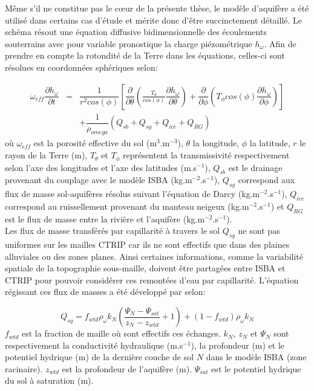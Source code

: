 Même s'il ne constitue pas le cœur de la présente thèse, le modèle d'aquifère a été utilisé dans certains cas d'étude et mérite donc d'être succinctement détaillé.
Le schéma résout une équation diffusive bidimensionnelle des écoulements souterrains avec pour variable pronostique la charge piézométrique $h_{\omega}$. Afin de prendre en compte la rotondité de la Terre dans les équations, celles-ci sont résolues en coordonnées sphériques selon:

\begin{eqnarray}
\omega_{eff} \dfrac{\partial h_{\omega}}{\partial t} &=& \dfrac{1}{r^{2} cos(\phi)}\left[\dfrac{\partial}{\partial \theta}\left(\frac{T_{\theta}}{cos(\phi)}\dfrac{\partial h_{\omega}}{\partial \theta}\right)+\dfrac{\partial}{\partial \phi}\left(T_{\phi}cos(\phi)\dfrac{\partial h_{\omega}}{\partial \phi}\right)\right] \\
& & + \dfrac{1}{\rho_{omega}}(Q_{sb}+Q_{sg}+Q_{ice}+Q_{RG}) \nonumber
\end{eqnarray}
où $\omega_{eff}$ est la porosité effective du sol (m$^{3}$.m$^{-3}$), $\theta$ la longitude, $\phi$ la latitude, $r$ le rayon de la Terre (m), $T_{\theta}$ et $T_{\phi}$ représentent la transmissivité respectivement selon l'axe des longitudes et l'axe des latitudes (m.s$^{-1}$), $Q_{sb}$ est le drainage provenant du couplage avec le modèle ISBA (kg.m$^{-2}$.s$^{-1}$), $Q_{sg}$ correspond aux flux de masse sol-aquifères résolus suivant l'équation de Darcy (kg.m$^{-2}$.s$^{-1}$), $Q_{ice}$ correspond au ruissellement provenant du manteau neigeux (kg.m$^{-2}$.s$^{-1}$) et $Q_{RG}$ est le flux de masse entre la rivière et l'aquifère (kg.m$^{-2}$.s$^{-1}$). \\

\noindent Les flux de masse transférés par capillarité à travers le sol $Q_{sg}$ ne sont pas uniformes sur les mailles CTRIP car ils ne sont effectifs que dans des plaines alluviales ou des zones planes. Ainsi certaines informations, comme la variabilité spatiale de la topographie sous-maille, doivent être partagées entre ISBA et CTRIP pour pouvoir considérer ces remontées d'eau par capillarité. L'équation régissant ces flux de masses a été développé par \citet{vergnes2014} selon:

\begin{equation}
Q_{sg} = f_{wtd}\rho_{\omega}k_{N}\left(\frac{\Psi_{N}-\Psi_{sat}}{z_{N}-z_{wtd}}+1\right)+(1-f_{wtd})\rho_{\omega}k_{N}
\end{equation}
$f_{wtd}$ est la fraction de maille où sont effectifs ces échanges. $k_{N}$, $z_{N}$ et $\Psi_{N}$ sont respectivement la conductivité hydraulique (m.s$^{-1}$), la profondeur (m) et le potentiel hydrique (m) de la dernière couche de sol $N$ dans le modèle ISBA (zone racinaire). $z_{wtd}$ est la profondeur de l'aquifère (m). $\Psi_{sat}$ est le potentiel hydrique du sol à saturation (m).\\
 
